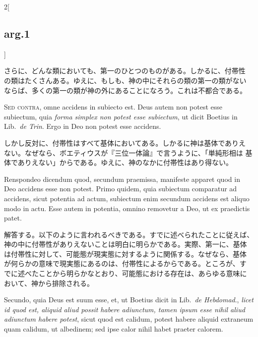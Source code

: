 \documentclass[paper=a4paper,fontsize=10pt,jafontsize=9pt,titlepage]{jlreq}
\begin{document}
\begin{paracol}{2}[\subsection{arg.1}]
\switchcolumn

さらに、どんな類においても、第一のひとつのものがある。しかるに、付帯性
の類はたくさんある。ゆえに、もしも、神の中にそれらの類の第一の類がない
ならば、多くの第一の類が神の外にあることになろう。これは不都合である。

\switchcolumn*[\subsection{s.c.}]

{\scshape Sed contra}, omne accidens in subiecto est. Deus autem non
 potest esse subiectum, quia {\itshape forma simplex non potest esse
 subiectum}, ut dicit Boetius in Lib.~{\itshape de Trin}. Ergo in Deo
 non potest esse accidens.

\switchcolumn

しかし反対に、付帯性はすべて基体においてある。しかるに神は基体でありえ
ない。なぜなら、ボエティウスが『三位一体論』で言うように、「単純形相は
基体でありえない」からである。ゆえに、神のなかに付帯性はあり得ない。


Renspondeo dicendum quod, secundum praemissa, manifeste apparet quod
in Deo accidens esse non potest.  Primo quidem, quia subiectum
comparatur ad accidens, sicut potentia ad actum, subiectum enim
secundum accidens est aliquo modo in actu.  Esse autem in potentia,
omnino removetur a Deo, ut ex praedictis patet.

\switchcolumn

解答する。以下のように言われるべきである。すでに述べられたことに従えば、
神の中に付帯性がありえないことは明白に明らかである。実際、第一に、基体
は付帯性に対して、可能態が現実態に対するように関係する。なぜなら、基体
が何らかの意味で現実態にあるのは、付帯性によるからである。ところが、す
でに述べたことから明らかなとおり、可能態における存在は、あらゆる意味に
おいて、神から排除される。

\switchcolumn*

Secundo, quia Deus est suum esse, et, ut Boetius dicit in
Lib.~{\itshape de Hebdomad}., {\itshape licet id quod est, aliquid
aliud possit habere adiunctum, tamen ipsum esse nihil aliud adiunctum
habere potest}, sicut quod est calidum, potest habere aliquid
extraneum quam calidum, ut albedinem; sed ipse calor nihil habet
praeter calorem.


\end{paracol}
\end{document}
